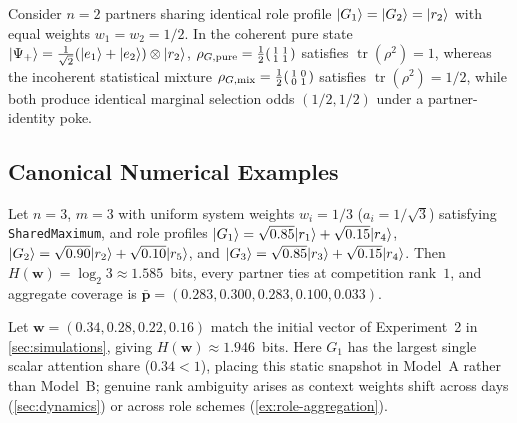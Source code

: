 \begin{example}
\label{ex:density-comparison}
Consider $n = 2$ partners sharing identical role profile $\lvert G_1 \rangle = \lvert G_2 \rangle = \lvert r_2 \rangle$
with equal weights $w_1 = w_2 = 1/2$. In the coherent pure state $\lvert \Psi_+ \rangle =
\frac{1}{\sqrt{2}}(\lvert e_1 \rangle + \lvert e_2 \rangle)\otimes\lvert r_2 \rangle$,
$\rho_{G,\mathrm{pure}} = \frac{1}{2}\begin{psmallmatrix} 1 & 1 \\ 1 & 1 \end{psmallmatrix}$
satisfies $\operatorname{tr}(\rho^2) = 1$, whereas the incoherent statistical mixture
$\rho_{G,\mathrm{mix}} = \frac{1}{2}\begin{psmallmatrix} 1 & 0 \\ 0 & 1 \end{psmallmatrix}$
satisfies $\operatorname{tr}(\rho^2) = 1/2$, while both produce identical marginal selection
odds $(1/2, 1/2)$ under a partner-identity poke.
\end{example}

\subsection{Canonical Numerical Examples}
\label{subsec:fw-examples}

\begin{example}
\label{ex:triad}
Let $n = 3$, $m = 3$ with uniform system weights $w_i = 1/3$ ($a_i = 1/\sqrt{3}$) satisfying
\textnormal{\texttt{SharedMaximum}}, and role profiles $\lvert G_1 \rangle = \sqrt{0.85}\lvert r_1 \rangle + \sqrt{0.15}\lvert r_4 \rangle$,
$\lvert G_2 \rangle = \sqrt{0.90}\lvert r_2 \rangle + \sqrt{0.10}\lvert r_5 \rangle$, and
$\lvert G_3 \rangle = \sqrt{0.85}\lvert r_3 \rangle + \sqrt{0.15}\lvert r_4 \rangle$. Then $H(\mathbf{w}) = \log_2 3 \approx 1.585$~bits,
every partner ties at competition rank~$1$, and aggregate coverage is
$\bar{\mathbf{p}} = (0.283, 0.300, 0.283, 0.100, 0.033)$.
\end{example}

\begin{example}
\label{ex:quartet}
Let $\mathbf{w} = (0.34, 0.28, 0.22, 0.16)$ match the initial vector of Experiment~2
in \cref{sec:simulations}, giving $H(\mathbf{w}) \approx 1.946$~bits. Here $G_1$ has the
largest single scalar attention share ($0.34 < 1$), placing this static snapshot in
Model~A rather than Model~B; genuine rank ambiguity arises as context weights shift across
days (\cref{sec:dynamics}) or across role schemes (\cref{ex:role-aggregation}).
\end{example}
